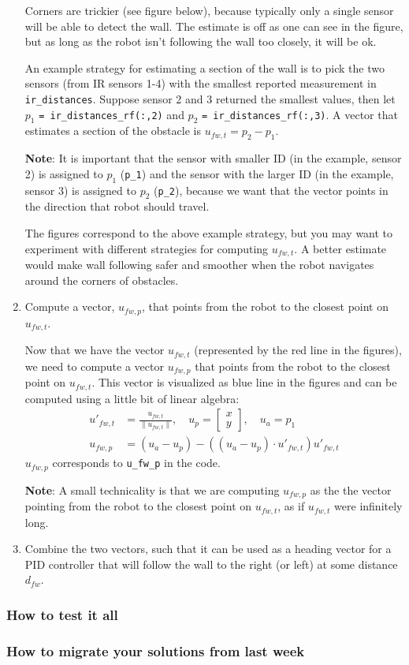 \documentclass[10pt]{article}
\begin{document}
\begin{enumerate}
	Corners are trickier (see figure below), because typically only a single sensor will be able to detect the wall. The estimate is off as one can see in the figure, but as long as the robot isn't following the wall too closely, it will be ok.
	
	An example strategy for estimating a section of the wall is to pick the two sensors (from IR sensors 1-4) with the smallest reported measurement in \texttt{ir\_distances}. Suppose sensor 2 and 3 returned the smallest values, then let $p_1$ \texttt{= ir\_distances\_rf(:,2)} and $p_2$ \texttt{= ir\_distances\_rf(:,3)}. A vector that estimates a section of the obstacle is $u_{fw,t}=p_2-p_1$. 
	
	\textbf{Note}: It is important that the sensor with smaller ID (in the example, sensor 2) is assigned to $p_1$ (\texttt{p\_1}) and the sensor with the larger ID (in the example, sensor 3) is assigned to $p_2$ (\texttt{p\_2}), because we want that the vector points in the direction that robot should travel.
	
	The figures correspond to the above example strategy, but you may want to experiment with different strategies for computing $u_{fw,t}$. A better estimate would make wall following safer and smoother when the robot navigates around the corners of obstacles. 
	
	\item Compute a vector, $u_{fw,p}$, that points from the robot to the closest point on $u_{fw,t}$.
	
	Now that we have the vector $u_{fw,t}$ (represented by the red line in the figures), we need to compute a vector $u_{fw,p}$ that points from the robot to the closest point on $u_{fw,t}$. This vector is visualized as blue line in the figures and can be computed using a little bit of linear algebra:
	\begin{equation*}
		\begin{split}
			u'_{fw,t} &= \frac{u_{fw,t}}{\|u_{fw,t}\|}, \quad u_p = \begin{bmatrix} x \\ y \end{bmatrix}, \quad u_a = p_1 \\
			u_{fw,p} &= (u_a-u_p)-((u_a-u_p)\cdot u'_{fw,t})u'_{fw,t}
		\end{split}
	\end{equation*}
	$u_{fw,p}$ corresponds to \texttt{u\_fw\_p} in the code. 
	
	\textbf{Note}: A small technicality is that we are computing $u_{fw,p}$ as the the vector pointing from the robot to the closest point on $u_{fw,t}$, as if $u_{fw,t}$ were infinitely long.
	
	\item Combine the two vectors, such that it can be used as a heading vector for a PID controller that will follow the wall to the right (or left) at some distance $d_{fw}$.
\end{enumerate}

\subsubsection*{How to test it all}

\subsubsection*{How to migrate your solutions from last week}
\end{document}
